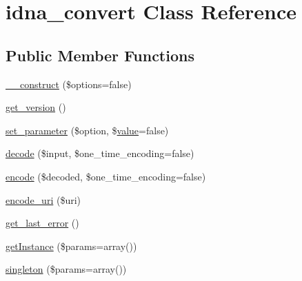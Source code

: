\hypertarget{classidna__convert}{}\section{idna\+\_\+convert Class Reference}
\label{classidna__convert}
\subsection*{Public Member Functions}
\begin{DoxyCompactItemize}
\item 
\hyperlink{classidna__convert_a41c710240381df950f03e3a7e4648a1e}{\+\_\+\+\_\+construct} (\$options=false)
\item 
\hyperlink{classidna__convert_a59d30af851a16b87ac00a96931fe7e61}{get\+\_\+version} ()
\item 
\hyperlink{classidna__convert_a1efc37a8bd5f6b08eed75e0b8e6f074d}{set\+\_\+parameter} (\$option, \$\hyperlink{jquery_8js_abe5393d870043cf6aaa1d5ad5fce755c}{value}=false)
\item 
\hyperlink{classidna__convert_a845094b11b91976cea00bd9b9e022cd5}{decode} (\$input, \$one\+\_\+time\+\_\+encoding=false)
\item 
\hyperlink{classidna__convert_ae6e83c86d02d1ad9b8a7eb48435863bd}{encode} (\$decoded, \$one\+\_\+time\+\_\+encoding=false)
\item 
\hyperlink{classidna__convert_a21b3f0bb158b689c9d835bb1c7a30114}{encode\+\_\+uri} (\$uri)
\item 
\hyperlink{classidna__convert_adcf7a0902a83a834ce05fc34a460fccd}{get\+\_\+last\+\_\+error} ()
\item 
\hyperlink{classidna__convert_aff2ec039994038d13c8000addff58de3}{get\+Instance} (\$params=array())
\item 
\hyperlink{classidna__convert_a899f287645e43d1fd44a627cdb6b0e79}{singleton} (\$params=array())
\end{DoxyCompactItemize}
